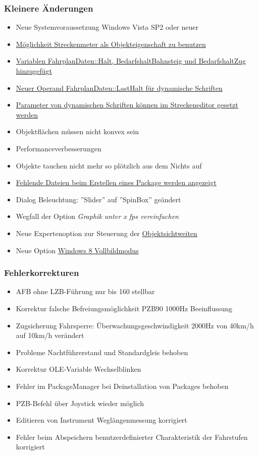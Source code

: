 \subsubsection{Kleinere Änderungen}
\begin{itemize}
\item Neue Systemvoraussetzung Windows Vista SP2 oder neuer 
\item \hyperref[sec:editor-obj-sichtbarkeitssteuerung-streig]{Möglichkeit Streckenmeter als Objekteigenschaft zu benutzen}
\item \hyperref[sec:editor-obj-logischeausdruecke-vars]{Variablen FahrplanDaten::Halt, BedarfshaltBahnsteig und BedarfshaltZug hinzugefügt}
\item \hyperref[sec:editor-obj-dynstr]{Neuer Operand FahrplanDaten::LastHalt für dynamische Schriften}
\item \hyperref[sec:editor-obj-dynstr-params]{Parameter von dynamischen Schriften können im Streckeneditor gesetzt werden}
\item Objektflächen müssen nicht konvex sein
\item Performanceverbesserungen
\item Objekte tauchen nicht mehr so plötzlich aus dem Nichts auf
\item \hyperref[sec:editor.allg.packages]{Fehlende Dateien beim Erstellen eines Package werden angezeigt}
\item Dialog Beleuchtung: ''Slider'' auf ''SpinBox'' geändert
\item Wegfall der Option \emph{Graphik unter x fps vereinfachen}
\item Neue Expertenoption zur Steuerung der \hyperref[sec.sim.optionen.darstellung]{Objektsichtweiten}
\item Neue Option \hyperref[sec.sim.optionen.darstellung]{Windows 8 Vollbildmodus}
\end{itemize}

\subsubsection{Fehlerkorrekturen}
\begin{itemize}
\item AFB ohne LZB-Führung nur bis 160 stellbar
\item Korrektur falsche Befreiungsmöglichkeit PZB90 1000Hz Beeinflussung
\item Zugsicherung Fahrsperre: Überwachungsgeschwindigkeit 2000Hz von 40km/h auf 10km/h verändert
\item Probleme Nachtführerstand und Standardgleis behoben
\item Korrektur OLE-Variable Wechselblinken
\item Fehler im PackageManager bei Deinstallation von Packages behoben
\item PZB-Befehl über Joystick wieder möglich
\item Editieren von Instrument Weglängenmessung korrigiert
\item Fehler beim Abspeichern benutzerdefinierter Charakteristik der Fahrstufen korrigiert
\end{itemize}

